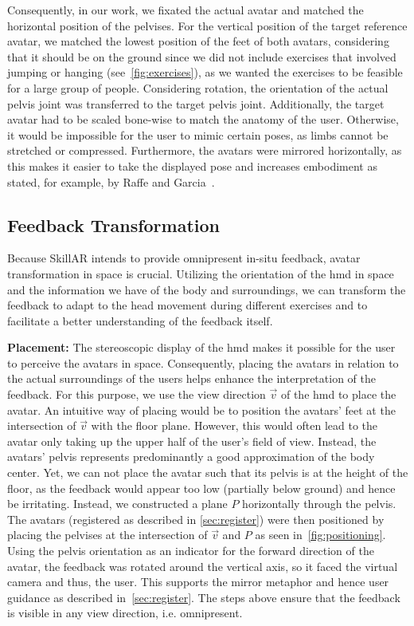 Consequently, in our work, we fixated the actual avatar and matched the horizontal position of the pelvises. For the vertical position of the target reference avatar, we matched the lowest position of the feet of both avatars, considering that it should be on the ground since we did not include exercises that involved jumping or hanging (see~\autoref{fig:exercises}), as we wanted the exercises to be feasible for a large group of people. Considering rotation, the orientation of the actual pelvis joint was transferred to the target pelvis joint. Additionally, the target avatar had to be scaled bone-wise to match the anatomy of the user. Otherwise, it would be impossible for the user to mimic certain poses, as limbs cannot be stretched or compressed. Furthermore, the avatars were mirrored horizontally, as this makes it easier to take the displayed pose and increases embodiment as stated, for example, by Raffe and Garcia~\cite{raffe2018combining}.

\subsection{Feedback Transformation \label{sec:transformation}}
Because SkillAR intends to provide omnipresent in-situ feedback, avatar transformation in space is crucial. Utilizing the orientation of the \acrshort{hmd} in space and the information we have of the body and surroundings, we can transform the feedback to adapt to the head movement during different exercises and to facilitate a better understanding of the feedback itself.

\textbf{Placement:}
The stereoscopic display of the \acrshort{hmd} makes it possible for the user to perceive the avatars in space. Consequently, placing the avatars in relation to the actual surroundings of the users helps enhance the interpretation of the feedback. For this purpose, we use the view direction $\vec{v}$ of the \acrshort{hmd} to place the avatar. An intuitive way of placing would be to position the avatars' feet at the intersection of $\vec{v}$ with the floor plane. However, this would often lead to the avatar only taking up the upper half of the user's field of view. Instead, the avatars' pelvis represents predominantly a good approximation of the body center. Yet, we can not place the avatar such that its pelvis is at the height of the floor, as the feedback would appear too low (partially below ground) and hence be irritating. Instead, we constructed a plane $P$ horizontally through the pelvis. The avatars (registered as described in \autoref{sec:register}) were then positioned by placing the pelvises at the intersection of $\vec{v}$ and $P$ as seen in~\autoref{fig:positioning}. Using the pelvis orientation as an indicator for the forward direction of the avatar, the feedback was rotated around the vertical axis, so it faced the virtual camera and thus, the user. This supports the mirror metaphor and hence user guidance as described in~\autoref{sec:register}. The steps above ensure that the feedback is visible in any view direction, i.e. omnipresent.

